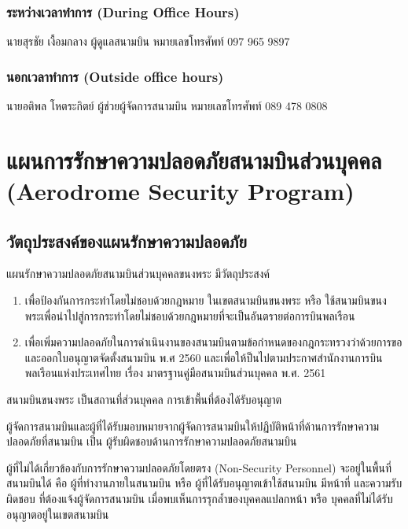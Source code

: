 \subsubsection{ระหว่างเวลาทำการ (During Office Hours)}

นายสุรชัย เงื้อมกลาง ผู้ดูแลสนามบิน หมายเลขโทรศัพท์ 097 965 9897


\subsubsection{นอกเวลาทำการ (Outside office hours)}

นายอติพล โหตระกิตย์ ผู้ช่วยผู้จัดการสนามบิน	หมายเลขโทรศัพท์ 089 478 0808

\section{แผนการรักษาความปลอดภัยสนามบินส่วนบุคคล (Aerodrome Security Program)}

\subsection{วัตถุประสงค์ของแผนรักษาความปลอดภัย}

แผนรักษาความปลอดภัยสนามบินส่วนบุคคลขนงพระ มีวัตถุประสงค์ 

\begin{enumerate}
\item เพื่อป้องกันการกระทำโดยไม่ชอบด้วยกฎหมาย ในเขตสนามบินขนงพระ หรือ ใช้สนามบินขนงพระเพื่อนำไปสู่การกระทำโดยไม่ชอบด้วยกฎหมายที่จะเป็นอันตรายต่อการบินพลเรือน
\item เพื่อเพิ่มความปลอดภัยในการดำเนินงานของสนามบินตามข้อกำหนดของกฎกระทรวงว่าด้วยการขอและออกใบอนุญาตจัดตั้งสนามบิน พ.ศ 2560 และเพื่อให้ป็นไปตามประกาศสำนักงานการบินพลเรือนแห่งประเทศไทย เรื่อง มาตรฐานคู่มือสนามบินส่วนบุคคล พ.ศ. 2561
\end{enumerate}

สนามบินขนงพระ เป็นสถานที่ส่วนบุคคล การเข้าพื้นที่ต้องได้รับอนุญาต 

ผู้จัดการสนามบินและผู้ที่ได้รับมอบหมายจากผู้จัดการสนามบินให้ปฏิบัติหน้าที่ด้านการรักษาความปลอดภัยที่สนามบิน  เป็น ผู้รับผิดชอบด้านการรักษาความปลอดภัยสนามบิน

ผู้ที่ไม่ได้เกี่ยวข้องกับการรักษาความปลอดภัยโดยตรง (Non-Security Personnel) จะอยู่ในพื้นที่สนามบินได้ คือ ผู้ที่ทำงานภายในสนามบิน หรือ ผู้ที่ได้รับอนุญาตเข้าใช้สนามบิน มีหน้าที่ และความรับผิดชอบ ที่ต้องแจ้งผู้จัดการสนามบิน เมื่อพบเห็นการรุกล้ำของบุคคลแปลกหน้า หรือ บุคคลที่ไม่ได้รับอนุญาตอยู่ในเขตสนามบิน


